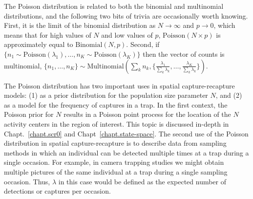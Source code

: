 The Poisson distribution is related to
both the binomial and multinomial distributions, and the following two
bits of trivia are occasionally worth knowing. First, it is the limit of the binomial
distribution as $N \to \infty$ and $p \to 0$, which means that for
high values of $N$ and low values
of $p$, $\text{Poisson}(N\times p)$ is approximately equal to $\text{Binomial}(N,
p)$. Second, if $\{n_1 \sim \text{Poisson}(\lambda_1),
\dots, n_K \sim \text{Poisson}(\lambda_K)\}$
then the vector of counts is multinomial, $\{n_1, \dots, n_K\}
\sim \text{Multinomial}(\sum_k n_k, \{\frac{\lambda_1}{\sum_k \lambda_k},
\dots, \frac{\lambda_K}{\sum_k \lambda_k}
\})$.

The Poisson distribution has two important uses in spatial
capture-recapture models: (1) as a prior distribution for the
population size parameter $N$, and (2) as a model for the frequency of
captures in a trap. In the first context, the Poisson prior for $N$
results in a Poisson point process for the location of the $N$
activity centers in the region of interest. This topic is discussed
in-depth in Chapt.~\ref{chapt.scr0} and Chapt~\ref{chapt.state-space}.
The second use of the Poisson distribution in spatial capture-recapture is
to describe data from sampling methods in which an
individual can be detected multiple times at a trap during a single
occasion. For example, in camera trapping studies we might obtain
multiple pictures of the same individual at a trap during a single sampling
occasion. Thus, $\lambda$ in this case would be defined as the
expected number of detections or captures per occasion.


